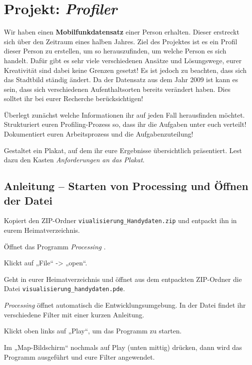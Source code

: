 \documentclass[loesung]{schulein}
\begin{document}
 
%
\section*{Projekt: \textit{Profiler}}
Wir haben einen \textbf{Mobilfunkdatensatz} einer Person erhalten. Dieser erstreckt sich über den Zeitraum eines halben Jahres. Ziel des Projektes ist es ein Profil dieser Person zu erstellen, um so herauszufinden, um welche Person es sich handelt. Dafür gibt es sehr viele verschiedenen Ansätze und Lösungswege, eurer Kreativität sind dabei keine Grenzen gesetzt! Es ist jedoch zu beachten, dass sich das Stadtbild ständig ändert. Da der Datensatz aus dem Jahr 2009 ist kann es sein, dass sich verschiedenen Aufenthaltsorten bereits verändert haben. Dies solltet ihr bei eurer Recherche berücksichtigen!

\begin{aufgaben}
\item Überlegt zunächst welche Informationen ihr auf jeden Fall herausfinden möchtet. Strukturiert euren Profiling-Prozess so, dass ihr die Aufgaben unter euch verteilt! Dokumentiert euren Arbeitsprozess und die Aufgabenzuteilung!

\item Gestaltet ein Plakat, auf dem ihr eure Ergebnisse übersichtlich präsentiert. Lest dazu den Kasten \textit{Anforderungen an das Plakat}.  

\end{aufgaben}
%
\begin{aufgabenbox}{}{}
\vspace*{-1em}
\subsection*{Anleitung -- Starten von Processing und Öffnen der Datei
}
\begin{smallitemize}
\item Kopiert den ZIP-Ordner \texttt{viualisierung\_Handydaten.zip} und entpackt ihn in eurem Heimatverzeichnis.
\item Öffnet das Programm \textit{Processing} .
\item Klickt auf „File“ -> „open“.
\item Geht in eurer Heimatverzeichnis und öffnet aus dem entpackten ZIP-Ordner die Datei \texttt{visualisierung\_handydaten.pde}.
\item \textit{Processing} öffnet automatisch die Entwicklungsumgebung. In der Datei
findet ihr verschiedene Filter mit einer kurzen Anleitung.
\item Klickt oben links auf „Play“, um das Programm zu starten.
\item Im „Map-Bildschirm“ nochmals auf Play (unten mittig) drücken, dann wird das Programm ausgeführt und eure Filter angewendet.


\end{smallitemize}
\end{aufgabenbox}
\end{document}
